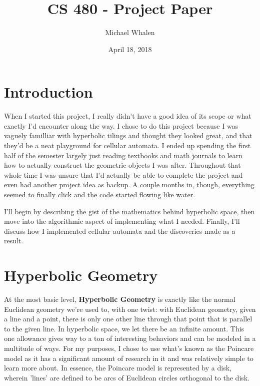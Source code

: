 \documentclass[letterpaper,12pt]{article}
\begin{document}
\title{CS 480 - Project Paper}
\author{Michael Whalen}
\date{April 18, 2018}
\maketitle
\setlength{\parindent}{4em}

\section*{Introduction}

When I started this project, I really didn't have a good idea of its scope or what exactly I'd encounter along the way. I chose to do this project because I was vaguely familliar with hyperbolic tilings and thought they looked great, and that they'd be a neat playground for cellular automata. I ended up spending the first half of the semester largely just reading textbooks and math journals to learn how to actually construct the geometric objects I was after. Throughout that whole time I was unsure that I'd actually be able to complete the project and even had another project idea as backup. A couple months in, though, everything seemed to finally click and the code started flowing like water. 

I'll begin by describing the gist of the mathematics behind hyperbolic space, then move into the algorithmic aspect of implementing what I needed. Finally, I'll discuss how I implemented cellular automata and the discoveries made as a result.

\section*{Hyperbolic Geometry}

At the most basic level, \textbf{Hyperbolic Geometry} is exactly like the normal Euclidean geometry we're used to, with one twist: with Euclidean geometry, given a line and a point, there is only one other line through that point that is parallel to the given line. In hyperbolic space, we let there be an infinite amount. This one allowance gives way to a ton of interesting behaviors and can be modeled in a multitude of ways. For my purposes, I chose to use what's known as the Poincare model as it has a significant amount of research in it and was relatively simple to learn more about. In essence, the Poincare model is represented by a disk, wherein 'lines' are defined to be arcs of Euclidean circles orthogonal to the disk.
\end{document}
